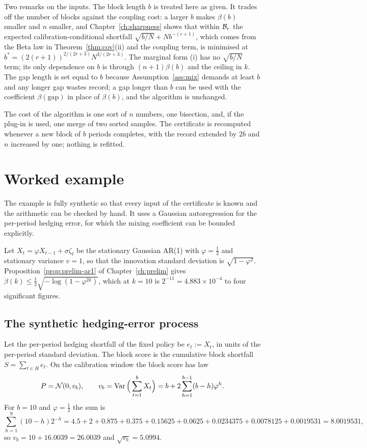 \documentclass[../../../main.tex]{subfiles}
\begin{document}
Two remarks on the inputs. The block length $b$ is treated here as given. It trades off the number of blocks against the coupling cost: a larger $b$ makes $\beta(b)$ smaller and $n$ smaller, and Chapter~\ref{ch:sharpness} shows that within $\mathcal B_{r}$ the expected calibration-conditional shortfall $\sqrt{b/N}+Nb^{-(r+1)}$, which comes from the Beta law in Theorem~\ref{thm:cov}(ii) and the coupling term, is minimised at $b^*=(2(r+1))^{2/(2r+3)}N^{3/(2r+3)}$. The marginal form (i) has no $\sqrt{b/N}$ term; its only dependence on $b$ is through $(n+1)\beta(b)$ and the ceiling in $k$. The gap length is set equal to $b$ because Assumption~\ref{ass:mix} demands at least $b$ and any longer gap wastes record; a gap longer than $b$ can be used with the coefficient $\beta(\text{gap})$ in place of $\beta(b)$, and the algorithm is unchanged.

The cost of the algorithm is one sort of $n$ numbers, one bisection, and, if the plug-in is used, one merge of two sorted samples. The certificate is recomputed whenever a new block of $b$ periods completes, with the record extended by $2b$ and $n$ increased by one; nothing is refitted.

\section{Worked example}\label{sec:cert-example}

The example is fully synthetic so that every input of the certificate is known and the arithmetic can be checked by hand. It uses a Gaussian autoregression for the per-period hedging error, for which the mixing coefficient can be bounded explicitly.

Let $X_t=\varphi X_{t-1}+\sigma\zeta_t$ be the stationary Gaussian AR(1) with $\varphi=\tfrac12$ and stationary variance $v=1$, so that the innovation standard deviation is $\sqrt{1-\varphi^2}$. Proposition~\ref{prop:prelim-ar1} of Chapter~\ref{ch:prelim} gives $\beta(k)\le\tfrac12\sqrt{-\log(1-\varphi^{2k})}$, which at $k=10$ is $2^{-11}=4.883\times10^{-4}$ to four significant figures.

\subsection{The synthetic hedging-error process}

Let the per-period hedging shortfall of the fixed policy be $e_t:=X_t$, in units of the per-period standard deviation. The block score is the cumulative block shortfall $S=\sum_{t\in H}e_t$. On the calibration window the block score has law
\[
P=\mathcal N(0,v_b),\qquad v_b=\operatorname{Var}\Big(\sum_{t=1}^bX_t\Big)=b+2\sum_{h=1}^{b-1}(b-h)\varphi^h .
\]
For $b=10$ and $\varphi=\tfrac12$ the sum is
\[
\sum_{h=1}^{9}(10-h)2^{-h}=4.5+2+0.875+0.375+0.15625+0.0625+0.0234375+0.0078125+0.0019531=8.0019531,
\]
so $v_b=10+16.0039=26.0039$ and $\sqrt{v_b}=5.0994$.
\end{document}
